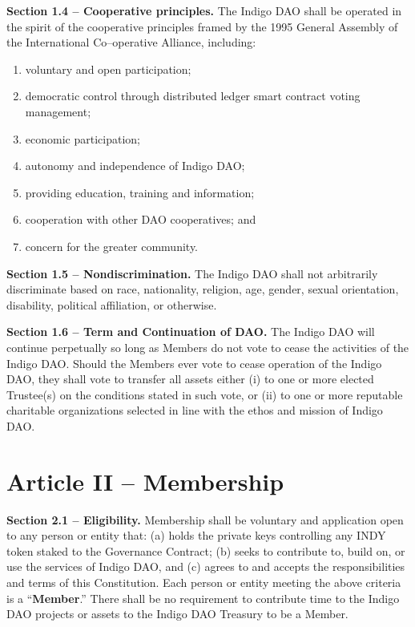 \textbf{Section 1.4 -- Cooperative principles.} The Indigo DAO shall be
operated in the spirit of the cooperative principles framed by the 1995
General Assembly of the International Co--operative Alliance, including:

\begin{enumerate}
\item
  voluntary and open participation;
\item
  democratic control through distributed ledger smart contract voting
  management;
\item
  economic participation;
\item
  autonomy and independence of Indigo DAO;
\item
  providing education, training and information;
\item
  cooperation with other DAO cooperatives; and
\item
  concern for the greater community.
\end{enumerate}

\textbf{Section 1.5 -- Nondiscrimination.} The Indigo DAO shall not
arbitrarily discriminate based on race, nationality, religion, age,
gender, sexual orientation, disability, political affiliation, or
otherwise.

\textbf{Section 1.6 -- Term and Continuation of DAO.} The Indigo DAO
will continue perpetually so long as Members do not vote to cease the
activities of the Indigo DAO. Should the Members ever vote to cease
operation of the Indigo DAO, they shall vote to transfer all assets
either (i) to one or more elected Trustee(s) on the conditions stated in
such vote, or (ii) to one or more reputable charitable organizations
selected in line with the ethos and mission of Indigo DAO.

\hypertarget{article-ii-membership}{%
\section{Article II -- Membership}\label{article-ii-membership}}

\textbf{Section 2.1 -- Eligibility.} Membership shall be voluntary and
application open to any person or entity that: (a) holds the private
keys controlling any INDY token staked to the Governance Contract; (b)
seeks to contribute to, build on, or use the services of Indigo DAO, and
(c) agrees to and accepts the responsibilities and terms of this
Constitution. Each person or entity meeting the above criteria is a
``\textbf{Member}.'' There shall be no requirement to contribute time to
the Indigo DAO projects or assets to the Indigo DAO Treasury to be a
Member.

